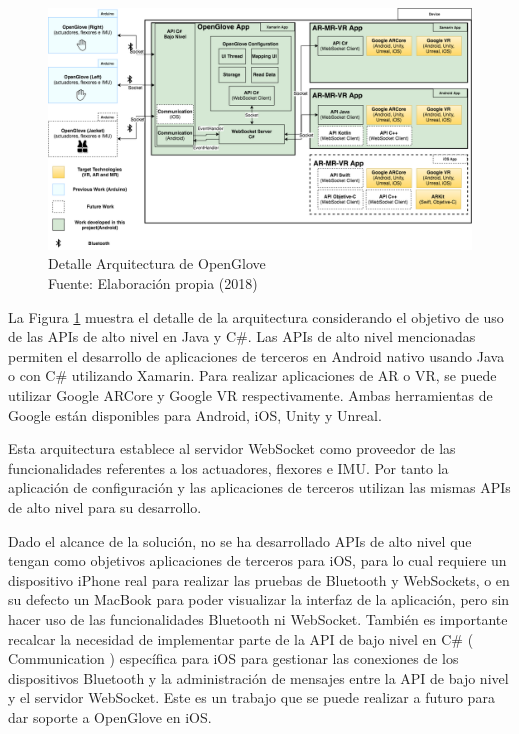 \begin{figure}[H]
  \begin{center} 
   	\includegraphics[width=1.0\textwidth]{images/chapter04/OpenGlove-Architecture-Specification.png} 
    \caption[Detalle Arquitectura de Openglove]{Detalle Arquitectura de OpenGlove \\Fuente: Elaboración propia (2018)}
    \label{fig:detalle-arquitectura-open-glove}
  \end{center}
\end{figure}

La Figura \ref{fig:detalle-arquitectura-open-glove} muestra el detalle de la arquitectura considerando el objetivo de uso de las APIs de alto nivel en Java y C\#. Las APIs de alto nivel mencionadas permiten el desarrollo de aplicaciones de terceros en Android nativo usando Java o con C\# utilizando Xamarin. Para realizar aplicaciones de AR o VR, se puede utilizar Google ARCore y Google VR respectivamente. Ambas herramientas de Google están disponibles para Android, iOS, Unity y Unreal.

Esta arquitectura establece al servidor WebSocket como proveedor de las funcionalidades referentes a los actuadores, flexores e IMU. Por tanto la aplicación de configuración y las aplicaciones de terceros utilizan las mismas APIs de alto nivel para su desarrollo.

Dado el alcance de la solución, no se ha desarrollado APIs de alto nivel que tengan como objetivos aplicaciones de terceros para iOS, para lo cual requiere un dispositivo iPhone real para realizar las pruebas de Bluetooth y WebSockets, o en su defecto un MacBook para poder visualizar la interfaz de la aplicación, pero sin hacer uso de las funcionalidades Bluetooth ni WebSocket. También es importante recalcar la necesidad de implementar parte de la API de bajo nivel en C\# ( Communication ) específica para iOS para gestionar las conexiones de los dispositivos Bluetooth y la administración de mensajes entre la API de bajo nivel y el servidor WebSocket. Este es un trabajo que se puede realizar a futuro para dar soporte a OpenGlove en iOS.


